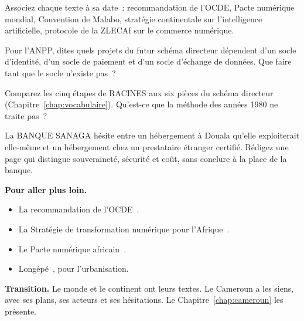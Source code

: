 \begin{boxexo}[title={\ding{45}\quad Exercice~5.1. Dates \niveaubase}]
Associez chaque texte à sa date~: recommandation de l'OCDE, Pacte numérique mondial, Convention de Malabo, stratégie continentale sur l'intelligence artificielle, protocole de la ZLECAf sur le commerce numérique.
\end{boxexo}

\begin{boxexo}[title={\ding{45}\quad Exercice~5.2. Socles \niveaumoyen}]
Pour l'ANPP, dites quels projets du futur schéma directeur dépendent d'un socle d'identité, d'un socle de paiement et d'un socle d'échange de données. Que faire tant que le socle n'existe pas~?
\end{boxexo}

\begin{boxexo}[title={\ding{45}\quad Exercice~5.3. RACINES aujourd'hui \niveaumoyen}]
Comparez les cinq étapes de RACINES aux six pièces du schéma directeur (Chapitre~\ref{chap:vocabulaire}). Qu'est-ce que la méthode des années 1980 ne traite pas~?
\end{boxexo}

\begin{boxexo}[title={\ding{45}\quad Exercice~5.4. Souveraineté \niveauexpert}]
La BANQUE SANAGA hésite entre un hébergement à Douala qu'elle exploiterait elle-même et un hébergement chez un prestataire étranger certifié. Rédigez une page qui distingue souveraineté, sécurité et coût, sans conclure à la place de la banque.
\end{boxexo}

\bigskip

\begin{boxinfo}
\textbf{Pour aller plus loin.}
\begin{itemize}
    \item La recommandation de l'OCDE~\cite{ocde2014}.
    \item La Stratégie de transformation numérique pour l'Afrique~\cite{ua2020dts}.
    \item Le Pacte numérique africain~\cite{ua2024pacte}.
    \item Longépé~\cite{longepe2001}, pour l'urbanisation.
\end{itemize}
\end{boxinfo}

\begin{boxinfo}
\textbf{Transition.} Le monde et le continent ont leurs textes. Le Cameroun a les siens, avec ses plans, ses acteurs et ses hésitations. Le Chapitre~\ref{chap:cameroun} les présente.
\end{boxinfo}
